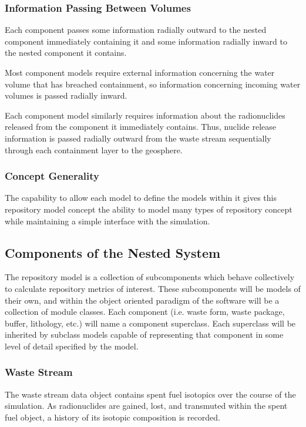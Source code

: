 \subsubsection{Information Passing Between Volumes}

Each component passes some information radially outward to the nested 
component immediately containing it and some information radially 
inward to the nested component it contains.

Most component models require external information concerning the 
water volume that has breached containment, so information concerning 
incoming water volumes is passed radially inward. 

Each component model similarly requires information about the radionuclides 
released from the component it immediately contains.  Thus, nuclide 
release information is passed radially outward from the waste stream 
sequentially through each containment layer to the geosphere.

\subsubsection{Concept Generality}

The capability to allow each model to define the models within it gives this 
repository model concept the ability to model many types of repository concept 
while maintaining a simple interface with the simulation. 

\subsection{Components of the Nested System}

The repository model is a collection of subcomponents which behave collectively 
to calculate repository metrics of interest. These subcomponents will be models 
of their own, and within the object oriented paradigm of the software will be 
a collection of module classes. Each component (i.e. waste form, waste 
package, buffer, lithology, etc.) will name a component superclass. Each superclass 
will be inherited by subclass models capable of representing that component in 
some level of detail specified by the model.

\subsubsection{Waste Stream}

The waste stream data object contains spent fuel isotopics over the 
course of the simulation. As radionuclides are gained, lost, and transmuted within 
the spent fuel object, a history of its isotopic composition is recorded.

